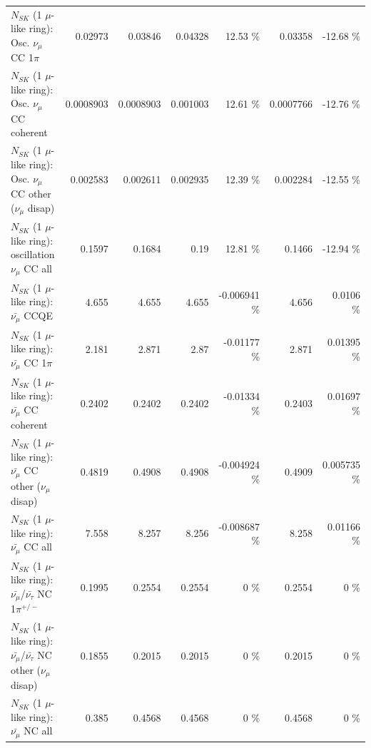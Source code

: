 \begin{table}
\begin{tabular}{| l | r | r | r  r | r  r |}
                          $N_{SK}$ (1 $\mu$-like ring): Osc. $\nu_\mu$ CC 1$\pi$ &         0.02973 &         0.03846 &         0.04328 &    12.53 \%  &         0.03358 &   -12.68 \%  \\ 
                        $N_{SK}$ (1 $\mu$-like ring): Osc. $\nu_\mu$ CC coherent &       0.0008903 &       0.0008903 &        0.001003 &    12.61 \%  &       0.0007766 &   -12.76 \%  \\ 
         $N_{SK}$ (1 $\mu$-like ring): Osc. $\nu_\mu$ CC other ($\nu_\mu$ disap) &        0.002583 &        0.002611 &        0.002935 &    12.39 \%  &        0.002284 &   -12.55 \%  \\ 
                      $N_{SK}$ (1 $\mu$-like ring): oscillation $\nu_\mu$ CC all &          0.1597 &          0.1684 &            0.19 &    12.81 \%  &          0.1466 &   -12.94 \%  \\ 
\hline
\hline
                              $N_{SK}$ (1 $\mu$-like ring): $\bar{\nu_\mu}$ CCQE &           4.655 &           4.655 &           4.655 & -0.006941 \%  &           4.656 &   0.0106 \%  \\ 
                         $N_{SK}$ (1 $\mu$-like ring): $\bar{\nu_\mu}$ CC 1$\pi$ &           2.181 &           2.871 &            2.87 & -0.01177 \%  &           2.871 &  0.01395 \%  \\ 
                       $N_{SK}$ (1 $\mu$-like ring): $\bar{\nu_\mu}$ CC coherent &          0.2402 &          0.2402 &          0.2402 & -0.01334 \%  &          0.2403 &  0.01697 \%  \\ 
        $N_{SK}$ (1 $\mu$-like ring): $\bar{\nu_\mu}$ CC other ($\nu_\mu$ disap) &          0.4819 &          0.4908 &          0.4908 & -0.004924 \%  &          0.4909 & 0.005735 \%  \\ 
                          $N_{SK}$ (1 $\mu$-like ring): $\bar{\nu_{\mu}}$ CC all &           7.558 &           8.257 &           8.256 & -0.008687 \%  &           8.258 &  0.01166 \%  \\ 
\hline
  $N_{SK}$ (1 $\mu$-like ring): $\bar{\nu_\mu}$/$\bar{\nu_\tau}$ NC 1$\pi^{+/-}$ &          0.1995 &          0.2554 &          0.2554 &        0 \%  &          0.2554 &        0 \%  \\ 
$N_{SK}$ (1 $\mu$-like ring): $\bar{\nu_\mu}$/$\bar{\nu_\tau}$ NC other ($\nu_\mu$ disap) &          0.1855 &          0.2015 &          0.2015 &        0 \%  &          0.2015 &        0 \%  \\ 
                          $N_{SK}$ (1 $\mu$-like ring): $\bar{\nu_{\mu}}$ NC all &           0.385 &          0.4568 &          0.4568 &        0 \%  &          0.4568 &        0 \%  \\ 

\end{tabular}
\end{table}
